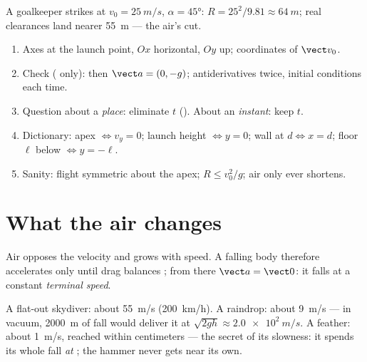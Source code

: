\begin{example}\label{ex:g12:projectile-motion:kick}
A goalkeeper strikes at $v_0 = \qty{25}{m/s}$, $\alpha = \ang{45}$:
$R = 25^2/9.81 \approx \qty{64}{m}$; real clearances land nearer
\qty{55}{m} --- the air's cut.
\end{example}

\begin{method}\label{met:g12:projectile-motion:method}
\begin{enumerate}
  \item Axes at the launch point, $Ox$ horizontal, $Oy$ up; coordinates
        of $\vect v_0$.
  \item Check  ( only): then $\vect a = (0,-g)$;
        antiderivatives twice, initial conditions each time.
  \item Question about a \emph{place}: eliminate $t$ (). About an
        \emph{instant}: keep $t$.
  \item Dictionary: apex $\Leftrightarrow v_y = 0$; launch height
        $\Leftrightarrow y = 0$; wall at $d \Leftrightarrow x = d$; floor
        $\ell$ below $\Leftrightarrow y = -\ell$.
  \item Sanity: flight symmetric about the apex; $R \leq v_0^2/g$; air only
        ever shortens.
\end{enumerate}
\end{method}

\section{What the air changes}

\begin{definition}\label{def:g12:projectile-motion:terminal}
Air  opposes the velocity and grows with speed. A falling body
therefore accelerates only until drag balances ; from there
$\vect a = \vect 0$: it falls at a constant \emph{terminal
speed}.
\end{definition}

\begin{example}\label{ex:g12:projectile-motion:airorders}
A flat-out skydiver: about \qty{55}{m/s} (\qty{200}{km/h}). A raindrop:
about \qty{9}{m/s} --- in vacuum, \qty{2000}{m} of fall would deliver it at
$\sqrt{2gh} \approx \qty{2.0e2}{m/s}$. A feather: about \qty{1}{m/s},
reached within centimeters --- the secret of its slowness: it spends its
whole fall \emph{at} ; the hammer never gets near its own.
\end{example}

